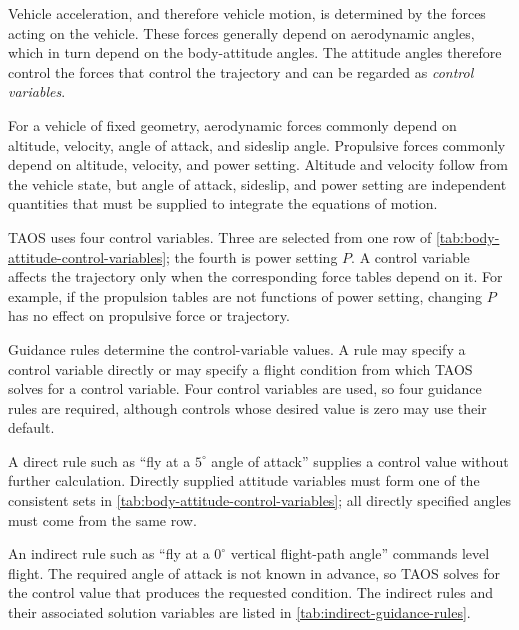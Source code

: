 
Vehicle acceleration, and therefore vehicle motion, is determined by the forces
acting on the vehicle. These forces generally depend on aerodynamic angles, which
in turn depend on the body-attitude angles. The attitude angles therefore control the
forces that control the trajectory and can be regarded as \emph{control variables}.

For a vehicle of fixed geometry, aerodynamic forces commonly depend on altitude,
velocity, angle of attack, and sideslip angle. Propulsive forces commonly depend on
altitude, velocity, and power setting. Altitude and velocity follow from the vehicle
state, but angle of attack, sideslip, and power setting are independent quantities that
must be supplied to integrate the equations of motion.

TAOS uses four control variables. Three are selected from one row of
\cref{tab:body-attitude-control-variables}; the fourth is power setting $P$. A
control variable affects the trajectory only when the corresponding force tables
depend on it. For example, if the propulsion tables are not functions of power
setting, changing $P$ has no effect on propulsive force or trajectory.


Guidance rules determine the control-variable values. A rule may specify a control
variable directly or may specify a flight condition from which TAOS solves for a
control variable. Four control variables are used, so four guidance rules are required,
although controls whose desired value is zero may use their default.

A direct rule such as ``fly at a $5^\circ$ angle of attack'' supplies a control value
without further calculation. Directly supplied attitude variables must form one of
the consistent sets in \cref{tab:body-attitude-control-variables}; all directly
specified angles must come from the same row.

An indirect rule such as ``fly at a $0^\circ$ vertical flight-path angle'' commands
level flight. The required angle of attack is not known in advance, so TAOS solves
for the control value that produces the requested condition. The indirect rules and
their associated solution variables are listed in
\cref{tab:indirect-guidance-rules}.

